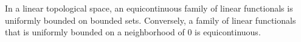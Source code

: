 In a linear topological space, an equicontinuous family of linear functionals is uniformly bounded on bounded sets. Conversely, a family of linear functionals that is uniformly bounded on a neighborhood of $0$ is equicontinuous.
